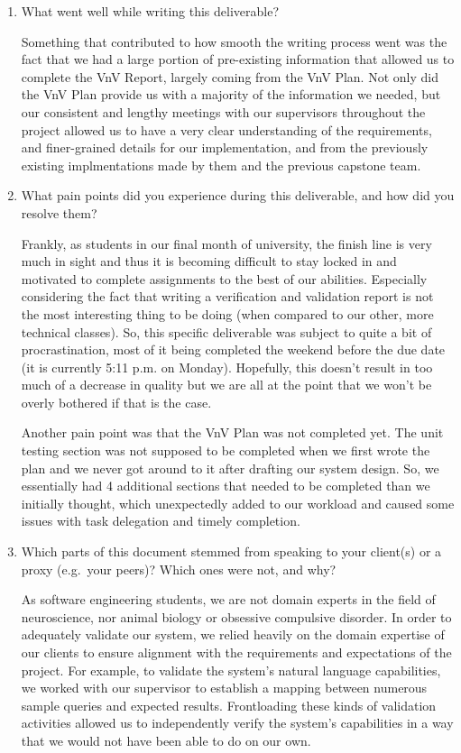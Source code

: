 \documentclass[12pt, titlepage]{article}
\begin{document}
\begin{enumerate}
  \item What went well while writing this deliverable?
  
  Something that contributed to how smooth the writing process went was the fact that 
  we had a large portion of pre-existing information that allowed us to complete the VnV Report, 
  largely coming from the VnV Plan. Not only did the VnV Plan provide us with a majority of 
  the information we needed, but our consistent and lengthy meetings with our supervisors 
  throughout the project allowed us to have a very clear understanding of the requirements, 
  and finer-grained details for our implementation, and from the previously existing implmentations 
  made by them and the previous capstone team. 

  \item What pain points did you experience during this deliverable, and how
    did you resolve them?

  Frankly, as students in our final month of university, the finish line is 
  very much in sight and thus it is becoming difficult to stay locked in and 
  motivated to complete assignments to the best of our abilities. Especially 
  considering the fact that writing a verification and validation report is not 
  the most interesting thing to be doing (when compared to our other, more 
  technical classes). So, this specific deliverable was subject to quite a bit 
  of procrastination, most of it being completed the weekend before the due date 
  (it is currently 5:11 p.m. on Monday). Hopefully, this doesn't result in too 
  much of a decrease in quality but we are all at the point that we won't be 
  overly bothered if that is the case.

  Another pain point was that the VnV Plan was not completed yet. The unit 
  testing section was not supposed to be completed when we first wrote the plan 
  and we never got around to it after drafting our system design. So, we 
  essentially had 4 additional sections that needed to be completed than we 
  initially thought, which unexpectedly added to our workload and caused some 
  issues with task delegation and timely completion.

  \item Which parts of this document stemmed from speaking to your client(s) or
  a proxy (e.g.\ your peers)? Which ones were not, and why?

  As software engineering students, we are not domain experts in the field of neuroscience, 
  nor animal biology or obsessive compulsive disorder. In order to adequately validate our system,
  we relied heavily on the domain expertise of our clients to ensure alignment with the 
  requirements and expectations of the project. For example, to validate the system's natural 
  language capabilities, we worked with our supervisor to establish a mapping between numerous sample queries
  and expected results. Frontloading these kinds of validation activities allowed us to independently 
  verify the system's capabilities in a way that we would not have been able to do on our own. 


\end{enumerate}
\end{document}
